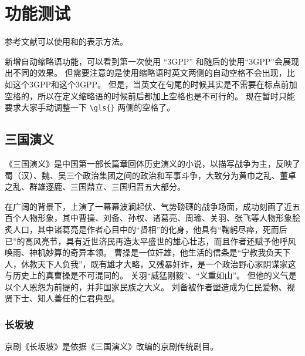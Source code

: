 
\chapter{功能测试}

参考文献可以使用\cite{BUPT_Thesis_Format_2014}和\parencite{BUPT_Thesis_Format_2004}的表示方法。

新增自动缩略语功能，可以看到第一次使用 ``\gls{3GPP}'' 和随后的使用``\gls{3GPP}{''}会展现出不同的效果。
但需要注意的是使用缩略语时英文两侧的自动空格不会出现，比如这个\gls{3GPP}和这个3GPP。
但是，当英文在句尾的时候其实是不需要在标点前加空格的，所以在定义缩略语的时候前后都加上空格也是不可行的。
现在暂时只能要求大家手动调整一下 \texttt{\textbackslash{}gls\{\}} 两侧的空格了。

\section{三国演义}
《三国演义》\cite{SANGUOYANYI}是中国第一部长篇章回体历史演义的小说，以描写战争为主，反映了蜀（汉）、魏、吴三个政治集团之间的政治和军事斗争，大致分为黄巾之乱、董卓之乱、群雄逐鹿、三国鼎立、三国归晋五大部分。

在广阔的背景下，上演了一幕幕波澜起伏、气势磅礴的战争场面，成功刻画了近五百个人物形象，其中曹操、刘备、孙权、诸葛亮、周瑜、关羽、张飞等人物形象脍炙人口，其中诸葛亮是作者心目中的“贤相”的化身，他具有“鞠躬尽瘁，死而后已”的高风亮节，具有近世济民再造太平盛世的雄心壮志，而且作者还赋予他呼风唤雨、神机妙算的奇异本领。
曹操是一位奸雄，他生活的信条是“宁教我负天下人，休教天下人负我”，既有雄才大略，又残暴奸诈，是一个政治野心家阴谋家这与历史上的真曹操是不可混同的。
关羽“威猛刚毅”、“义重如山”。
但他的义气是以个人恩怨为前提的，并非国家民族之大义。
刘备被作者塑造成为仁民爱物、视贤下士、知人善任的仁君典型。

\subsection{长坂坡}
京剧《长坂坡》\cite{CHANGBANPO}是依据《三国演义》改编的京剧传统剧目。

